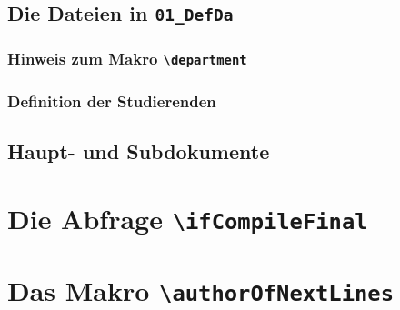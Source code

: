 		\subsection			{Die Dateien in \texttt{01\_DefDa}}								
			\subsubsection	{Hinweis zum Makro \texttt{\textbackslash department}}			
			\subsubsection	{Definition der Studierenden}									
		\subsection			{Haupt- und Subdokumente}										
	\section				{Die Abfrage \texttt{\textbackslash ifCompileFinal}}			
	\section				{Das Makro \texttt{\textbackslash authorOfNextLines}}			

